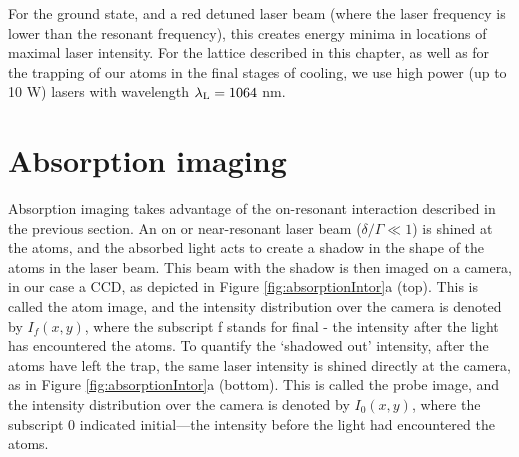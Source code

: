For the ground state, and a red detuned laser beam (where the laser frequency is lower than the resonant frequency), this creates energy minima in locations of maximal laser intensity. For the lattice described in this chapter, as well as for the trapping of our atoms in the final stages of cooling, we use high power (up to 10 W) lasers with wavelength $\lambda_{\rm L} = 1064 $ nm. 

\section{Absorption imaging}\label{sec:absorptionImaging}

Absorption imaging takes advantage of the on-resonant interaction described in the previous section. An on or near-resonant laser beam ($\delta/\Gamma\ll 1$) is shined at the atoms, and the absorbed light acts to create a shadow in the shape of the atoms in the laser beam. This beam with the shadow is then imaged on a camera, in our case a CCD, as depicted in Figure \ref{fig:absorptionIntor}a (top). This is called the atom image, and the intensity distribution over the camera is denoted by $I_f(x,y)$, where the subscript f stands for final - the intensity after the light has encountered the atoms. To quantify the \lq{shadowed out}\rq{} intensity, after the atoms have left the trap, the same laser intensity is shined directly at the camera, as in Figure \ref{fig:absorptionIntor}a (bottom).   This is called the probe image, and the intensity distribution over the camera is denoted by $I_0(x,y)$, where the subscript 0 indicated initial---the intensity before the light had encountered the atoms.



